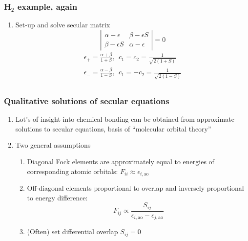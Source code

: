 \documentclass[11pt]{article}
\begin{document}
\subsubsection{H\(_2\) example, again}
\label{sec:org1ea8dc4}
\begin{enumerate}
\item Set-up and solve secular matrix
\begin{displaymath}
 \left | \begin{array}{cc}
     \alpha-\epsilon & \beta-\epsilon S \\
     \beta - \epsilon S & \alpha-\epsilon
     \end{array} \right | = 0
\end{displaymath}
\begin{eqnarray*}
  \epsilon_+=\frac{\alpha+\beta}{1+S},\ \ c_1=c_2=\frac{1}{\sqrt{2(1+S)}} \\
  \epsilon_-=\frac{\alpha-\beta}{1-S},\ \ c_1=-c_2=\frac{1}{\sqrt{2(1-S)}} \\
\end{eqnarray*}
\end{enumerate}
\subsubsection{Qualitative solutions of secular equations}
\label{sec:org4da6954}
\begin{enumerate}
\item Lot's of insight into chemical bonding can be obtained from approximate solutions to secular equations, basis of ``molecular orbital theory''
\item Two general assumptions
\begin{enumerate}
\item Diagonal Fock elements are approximately equal to energies of corresponding atomic orbitals: \(F_{ii} \approx \epsilon_{i,\mathrm{ao}}\)
\item Off-diagonal elements proportional to overlap and inversely proportional to energy difference:
\begin{displaymath}
  F_{ij} \propto \frac{S_{ij}}{\epsilon_{i,\mathrm{ao}}-\epsilon_{j,\mathrm{ao}}}
\end{displaymath}
\item (Often) set differential overlap \(S_{ij}=0\)
\end{enumerate}
\end{enumerate}
\end{document}
